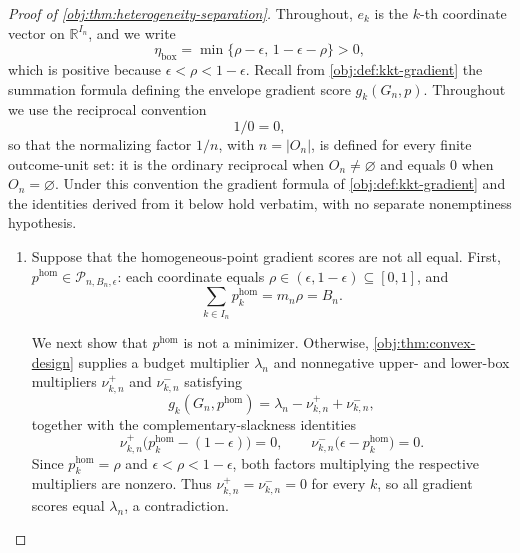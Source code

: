 \begin{proof}[Proof of \cref{obj:thm:heterogeneity-separation}]
Throughout, \(e_k\) is the \(k\)-th coordinate vector on \(\mathbb R^{I_n}\), and we write
\[
\eta_{\mathrm{box}}=\min\{\rho-\epsilon,\,1-\epsilon-\rho\}>0,
\]
which is positive because \(\epsilon<\rho<1-\epsilon\).  Recall from \cref{obj:def:kkt-gradient} the summation formula defining the envelope gradient score \(g_k(G_n,p)\).  Throughout we use the reciprocal convention
\[
1/0=0,
\]
so that the normalizing factor \(1/n\), with \(n=\lvert O_n\rvert\), is defined for every finite outcome-unit set: it is the ordinary reciprocal when \(O_n\neq\varnothing\) and equals \(0\) when \(O_n=\varnothing\).  Under this convention the gradient formula of \cref{obj:def:kkt-gradient} and the identities derived from it below hold verbatim, with no separate nonemptiness hypothesis.

\begin{enumerate}
\item Suppose that the homogeneous-point gradient scores are not all equal.  First, \(p^{\mathrm{hom}}\in\mathcal P_{n,B_n,\epsilon}\): each coordinate equals \(\rho\in(\epsilon,1-\epsilon)\subseteq[0,1]\), and
\[
\sum_{k\in I_n}p^{\mathrm{hom}}_k=m_n\rho=B_n.
\]

We next show that \(p^{\mathrm{hom}}\) is not a minimizer.  Otherwise, \cref{obj:thm:convex-design} supplies a budget multiplier \(\lambda_n\) and nonnegative upper- and lower-box multipliers \(\nu^+_{k,n}\) and \(\nu^-_{k,n}\) satisfying
\[
g_k(G_n,p^{\mathrm{hom}})
=\lambda_n-\nu^+_{k,n}+\nu^-_{k,n},
\]
together with the complementary-slackness identities
\[
\nu^+_{k,n}\bigl(p^{\mathrm{hom}}_k-(1-\epsilon)\bigr)=0,
\qquad
\nu^-_{k,n}\bigl(\epsilon-p^{\mathrm{hom}}_k\bigr)=0.
\]
Since \(p^{\mathrm{hom}}_k=\rho\) and \(\epsilon<\rho<1-\epsilon\), both factors multiplying the respective multipliers are nonzero.  Thus \(\nu^+_{k,n}=\nu^-_{k,n}=0\) for every \(k\), so all gradient scores equal \(\lambda_n\), a contradiction.


\end{enumerate}
\end{proof}

